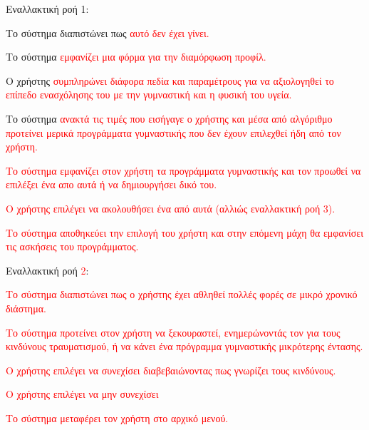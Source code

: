     

Εναλλακτική ροή 1:
\begin{enumerate}[label=2.\alph*.,ref=2.\alph*]
    \item Το σύστημα διαπιστώνει πως \textcolor{red}{αυτό δεν έχει γίνει.}
    \item Το σύστημα \textcolor{red}{εμφανίζει μια φόρμα για την διαμόρφωση προφίλ.}
    \item Ο χρήστης \textcolor{red}{συμπληρώνει διάφορα πεδία και παραμέτρους για να αξιολογηθεί το επίπεδο ενασχόλησης του με την γυμναστική και η φυσική του υγεία.}
    \item Το σύστημα \textcolor{red}{ανακτά τις τιμές που εισήγαγε ο χρήστης και μέσα από αλγόριθμο προτείνει μερικά προγράμματα γυμναστικής που δεν έχουν επιλεχθεί ήδη από τον χρήστη.}
    \item \textcolor{red}{Το σύστημα εμφανίζει στον χρήστη τα προγράμματα γυμναστικής και τον προωθεί να επιλέξει ένα απο αυτά ή να δημιουργήσει δικό του.
    \item Ο χρήστης επιλέγει να ακολουθήσει ένα από αυτά (αλλιώς εναλλακτική ροή 3).
    \item Το σύστημα αποθηκεύει την επιλογή του χρήστη και στην επόμενη μάχη θα εμφανίσει τις ασκήσεις του προγράμματος.}
\end{enumerate}

Εναλλακτική ροή \textcolor{red}{2}:
\begin{enumerate}[label=4.\alph*.,ref=4.\alph*]
\textcolor{red}{
    \item Το σύστημα διαπιστώνει πως ο χρήστης έχει αθληθεί πολλές φορές σε μικρό χρονικό διάστημα.
    \item Το σύστημα προτείνει στον χρήστη να ξεκουραστεί, ενημερώνοντάς τον για τους κινδύνους τραυματισμού, ή να κάνει ένα πρόγραμμα γυμναστικής μικρότερης έντασης.
    \item Ο χρήστης επιλέγει να συνεχίσει διαβεβαιώνοντας πως γνωρίζει τους κινδύνους.}
\begin{enumerate}[label=4.\alph*.,ref=4.\alph*]
\textcolor{red}{
    \item Ο χρήστης επιλέγει να μην συνεχίσει
    \item Το σύστημα μεταφέρει τον χρήστη στο αρχικό μενού.}
\end{enumerate}
\end{enumerate}



